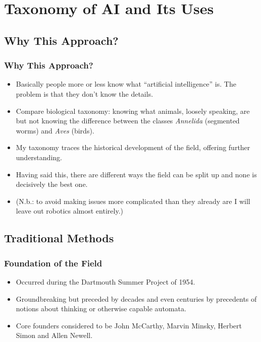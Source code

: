 \documentclass[10pt]{beamer}
\begin{document}
  \section{Taxonomy of AI and Its Uses}

  \subsection{Why This Approach?}

  \begin{frame}
    \frametitle{Why This Approach?}

    \begin{itemize}
      \item Basically people more or less know what ``artificial
        intelligence'' is. The problem is that they don't know the details.
      \pause
      \item Compare biological taxonomy: knowing what animals, loosely
        speaking, are but not knowing the difference between the classes
        \textit{Annelida} (segmented worms) and \textit{Aves} (birds).
      \pause
      \item My taxonomy traces the historical development of the field, offering
        further understanding.
      \pause
      \item Having said this, there are different ways the field can be split
        up and none is decisively the best one.
      \pause
      \item (N.b.: to avoid making issues more complicated than they already
        are I will leave out robotics almost entirely.)
    \end{itemize}
  \end{frame}

  \subsection{Traditional Methods}

  \begin{frame}
    \frametitle{Foundation of the Field}
    \begin{itemize}
      \item Occurred during the Dartmouth Summer Project of 1954.
      \pause
      \item Groundbreaking but preceded by decades and even centuries by
        precedents of notions about thinking or otherwise capable automata.
      \pause
      \item Core founders considered to be John McCarthy, Marvin Minsky,
        Herbert Simon and Allen Newell.
    \end{itemize}
  \end{frame}
\end{document}
